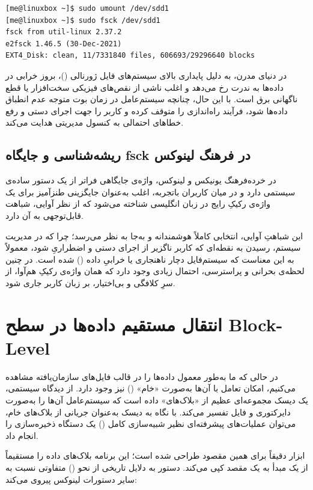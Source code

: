 \begin{latin}
\begin{lstlisting}
[me@linuxbox ~]$ sudo umount /dev/sdd1
[me@linuxbox ~]$ sudo fsck /dev/sdd1
fsck from util-linux 2.37.2
e2fsck 1.46.5 (30-Dec-2021)
EXT4_Disk: clean, 11/7331840 files, 606693/29296640 blocks
\end{lstlisting}
\end{latin}

در دنیای مدرن، به دلیل پایداری بالای سیستم‌های فایل ژورنالی ()، بروز خرابی در داده‌ها به ندرت رخ می‌دهد و اغلب ناشی از نقص‌های فیزیکی سخت‌افزار یا قطع ناگهانی برق است. با این حال، چنانچه سیستم‌عامل در زمان بوت متوجه عدم انطباق داده‌ها شود، فرآیند راه‌اندازی را متوقف کرده و کاربر را جهت اجرای دستی  و رفع خطاهای احتمالی به کنسول مدیریتی هدایت می‌کند.

\subsection{ریشه‌شناسی و جایگاه fsck در فرهنگ لینوکس}

در خرده‌فرهنگ یونیکس و لینوکس، واژه‌ی  جایگاهی فراتر از یک دستور ساده‌ی سیستمی دارد و در میان کاربران باتجربه، اغلب به‌عنوان جایگزینی طنزآمیز برای یک واژه‌ی رکیکِ رایج در زبان انگلیسی شناخته می‌شود که از نظر آوایی، شباهت قابل‌توجهی به آن دارد.

این شباهتِ آوایی، انتخابی کاملاً هوشمندانه و به‌جا به نظر می‌رسد؛ چرا که در مدیریت سیستم، رسیدن به نقطه‌ای که کاربر ناگزیر از اجرای دستی و اضطراریِ  شود، معمولاً به این معناست که سیستم‌فایل دچار ناهنجاری یا خرابیِ داده () شده است. در چنین لحظه‌ی بحرانی و پراسترسی، احتمال زیادی وجود دارد که همان واژه‌ی رکیکِ هم‌آوا، از سرِ کلافگی و بی‌اختیار، بر زبان کاربر جاری شود.

\section{انتقال مستقیم داده‌ها در سطح Block-Level}

در حالی که ما به‌طور معمول داده‌ها را در قالب فایل‌های سازمان‌یافته مشاهده می‌کنیم، امکان تعامل با آن‌ها به‌صورت «خام» () نیز وجود دارد. از دیدگاه سیستمی، یک دیسک مجموعه‌ای عظیم از «بلاک‌های» داده است که سیستم‌عامل آن‌ها را به‌صورت دایرکتوری و فایل تفسیر می‌کند. با نگاه به دیسک به‌عنوان جریانی از بلاک‌های خام، می‌توان عملیات‌های پیشرفته‌ای نظیر شبیه‌سازی کامل () یک دستگاه ذخیره‌سازی را انجام داد.

ابزار  دقیقاً برای همین مقصود طراحی شده است؛ این برنامه بلاک‌های داده را مستقیماً از یک مبدأ به یک مقصد کپی می‌کند. دستور  به دلایل تاریخی از نحو () متفاوتی نسبت به سایر دستورات لینوکس پیروی می‌کند:

